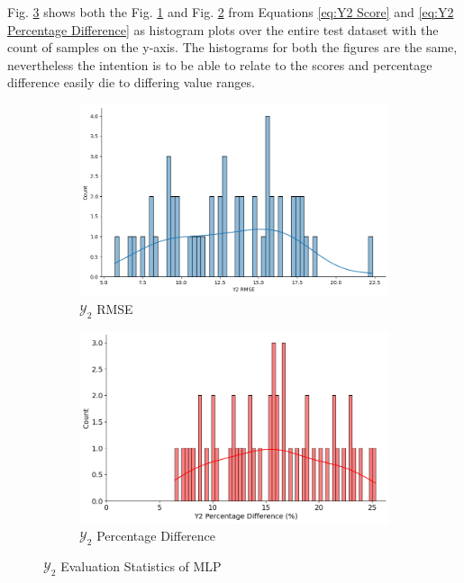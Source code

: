 \documentclass{report} %
\begin{document}
Fig. \ref{fig:Y2 Evaluation Statistics MLP} shows both the Fig. \ref{fig:Y2 RMSE} and Fig. \ref{fig:Y2 Percentage Difference} from Equations \ref{eq:Y2 Score} 
and \ref{eq:Y2 Percentage Difference} as histogram plots over the entire test dataset with the count of samples on the y-axis.
The histograms for both the figures are the same, nevertheless the intention is to be able to relate to the scores and percentage difference easily die to differing 
value ranges.
\begin{figure}[H]
    \centering
    \begin{subfigure}{0.5\textwidth}
        \centering
        \includegraphics[width=\textwidth]{./ReportImages/score_MLP_y2.png}
        \caption{$\mathcal{Y}_2$ \ac{RMSE}}
        \label{fig:Y2 RMSE}
    \end{subfigure}\hfill
    \begin{subfigure}{0.5\textwidth}
        \centering
        \includegraphics[width=\textwidth]{./ReportImages/percentage_diff_MLP_y2.png}
        \caption{$\mathcal{Y}_2$ Percentage Difference}
        \label{fig:Y2 Percentage Difference}
    \end{subfigure}
    \caption{$\mathcal{Y}_2$ Evaluation Statistics of \ac{MLP}}
    \label{fig:Y2 Evaluation Statistics MLP}
\end{figure}
\end{document}
